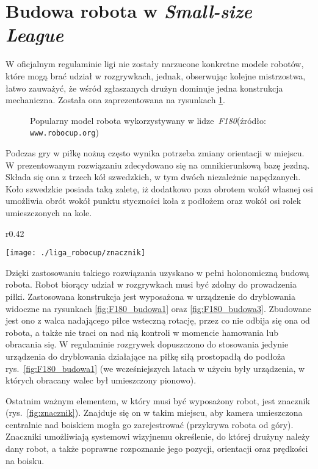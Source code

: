 \section{Budowa robota \label{sec:budowa_robota} w \emph{Small-size League}}
	W oficjalnym regulaminie ligi nie zostały narzucone konkretne modele robotów, które mogą brać udział w
	rozgrywkach, jednak, obserwując kolejne mistrzostwa, łatwo zauważyć, że wśród zgłaszanych drużyn dominuje jedna konstrukcja mechaniczna. Została ona zaprezentowana na  rysunkach \ref{fig:F180_budowa}.
 	\begin{figure}
	\centering
	\caption{Popularny model robota wykorzystywany w \mbox{lidze \emph{F180}}\newline(źródło: \texttt{www.robocup.org}) }
	\label{fig:F180_budowa}
	\end{figure}
	Podczas gry w piłkę nożną często wynika potrzeba zmiany orientacji w miejscu. W prezentowanym rozwiązaniu
	zdecydowano się na omnikierunkową bazę jezdną. Składa się ona z trzech kół szwedzkich, w tym dwóch niezależnie
	napędzanych. Koło szwedzkie posiada taką zaletę, iż dodatkowo poza obrotem wokół własnej osi umożliwia obrót
	wokół punktu styczności koła z podłożem oraz wokół osi rolek umieszczonych na kole.
	\begin{wrapfigure}{r}{0.42\textwidth}
	\vspace{-30pt}
	\begin{center}	
	\texttt{[image: ./liga\_robocup/znacznik]}
	\end{center}
	\vspace{-10pt}	
	\caption{Znacznik umożliwiający systemowi wizyjnemu identyfikację robotów \label{fig:znacznik}}
	\vspace{-10pt}
	\end{wrapfigure}
	Dzięki zastosowaniu takiego rozwiązania uzyskano w pełni holonomiczną budową robota.
	Robot biorący udział w rozgrywkach musi być zdolny do prowadzenia piłki. Zastosowana konstrukcja jest wyposażona w urządzenie do dryblowania widoczne na rysunkach \ref{fig:F180_budowa1} oraz \ref{fig:F180_budowa3}. 
	Zbudowane jest ono z walca nadającego piłce wsteczną rotację, przez co nie odbija się ona od robota, a także nie traci on nad nią kontroli w momencie hamowania lub obracania się.
	W regulaminie rozgrywek dopuszczono do stosowania jedynie urządzenia do dryblowania 
	działające na piłkę siłą
	prostopadłą do podłoża rys.~\ref{fig:F180_budowa1} (we wcześniejszych latach w użyciu były  urządzenia, w których obracany walec był umieszczony pionowo).

	Ostatnim ważnym elementem, w który musi być wyposażony robot, jest znacznik (rys.~\ref{fig:znacznik}).
	Znajduje się on w takim miejscu, aby kamera umieszczona centralnie nad boiskiem mogła go zarejestrować (przykrywa robota od góry).
	Znaczniki umożliwiają systemowi wizyjnemu określenie, do której drużyny należy dany robot, a także poprawne rozpoznanie jego pozycji, orientacji oraz prędkości
	na boisku.

